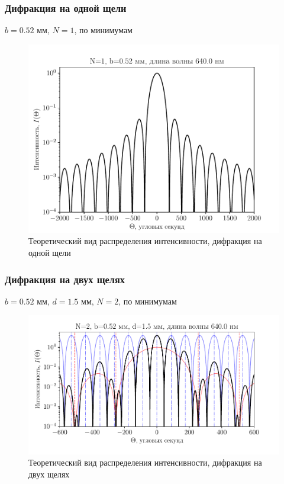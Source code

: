 \subsubsection{Дифракция на одной щели}
\begin{table}[H]
	    \caption{$b=0.52$ мм, $N=1$, по минимумам}
	    \label{tab:chem1}

	\mytable
	
\end{table}
\begin{figure}[H]
	\centering
	\includegraphics[]{plot/N1}
	\caption{Теоретический вид распределения интенсивности, дифракция на одной щели}
	\label{fig:figure1}
\end{figure}
\subsubsection{Дифракция на двух щелях}

\begin{table}[H]
	    \caption{$b=0.52$ мм, $d=1.5$ мм, $N=2$, по минимумам}
	    \label{tab:chem1} 

	\mytable
	
\end{table}
\begin{figure}[H]
	\centering
	\includegraphics[]{plot/N2}
	\caption{Теоретический вид распределения интенсивности, дифракция на двух щелях}
	\label{fig:figure1}
\end{figure}
